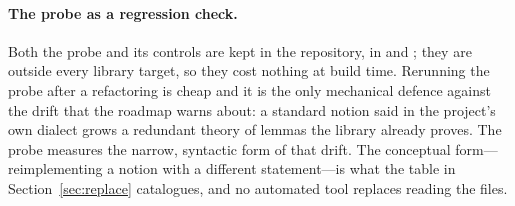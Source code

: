 \paragraph{The probe as a regression check.} Both the probe and its controls are kept in
the repository, in  and
; they are outside every library target, so they cost
nothing at build time. Rerunning the probe after a refactoring is cheap and it is the only
mechanical defence against the drift that the \TauCeti{} roadmap warns about: a standard
notion said in the project's own dialect grows a redundant theory of lemmas the library
already proves. The probe measures the narrow, syntactic form of that drift. The conceptual
form---reimplementing a notion with a different statement---is what the table in
Section~\ref{sec:replace} catalogues, and no automated tool replaces reading the files.
